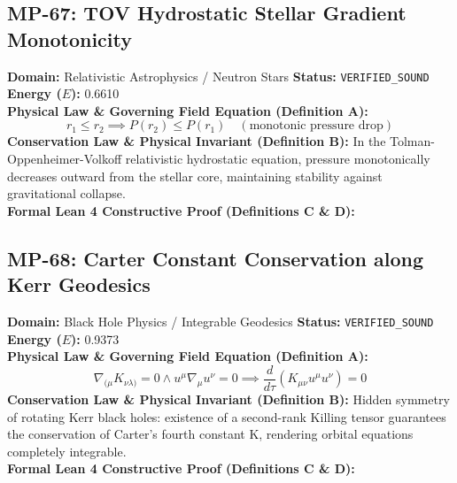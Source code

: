 \subsection{MP-67: TOV Hydrostatic Stellar Gradient Monotonicity}
\textbf{Domain:} Relativistic Astrophysics / Neutron Stars \hfill \textbf{Status:} \texttt{VERIFIED\_SOUND} \hfill \textbf{Energy ($E$):} 0.6610\\
\textbf{Physical Law \& Governing Field Equation (Definition A):}
\begin{equation*}
r_1 \le r_2 \implies P(r_2) \le P(r_1) \quad (\text{monotonic pressure drop})
\end{equation*}
\textbf{Conservation Law \& Physical Invariant (Definition B):}
In the Tolman-Oppenheimer-Volkoff relativistic hydrostatic equation, pressure monotonically decreases outward from the stellar core, maintaining stability against gravitational collapse.\\

\textbf{Formal Lean 4 Constructive Proof (Definitions C \& D):}


\vspace{1em}
\subsection{MP-68: Carter Constant Conservation along Kerr Geodesics}
\textbf{Domain:} Black Hole Physics / Integrable Geodesics \hfill \textbf{Status:} \texttt{VERIFIED\_SOUND} \hfill \textbf{Energy ($E$):} 0.9373\\
\textbf{Physical Law \& Governing Field Equation (Definition A):}
\begin{equation*}
\nabla_{(\mu} K_{\nu\lambda)} = 0 \wedge u^\mu \nabla_\mu u^\nu = 0 \implies \frac{d}{d\tau}(K_{\mu\nu} u^\mu u^\nu) = 0
\end{equation*}
\textbf{Conservation Law \& Physical Invariant (Definition B):}
Hidden symmetry of rotating Kerr black holes: existence of a second-rank Killing tensor guarantees the conservation of Carter's fourth constant K, rendering orbital equations completely integrable.\\

\textbf{Formal Lean 4 Constructive Proof (Definitions C \& D):}


\vspace{1em}
